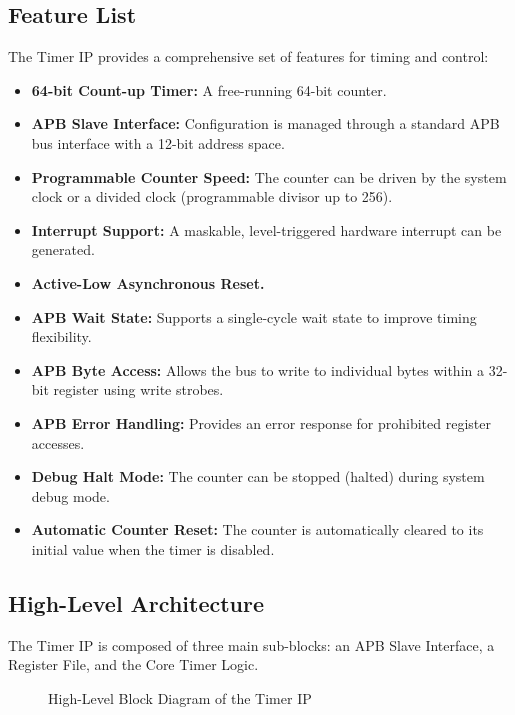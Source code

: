 \documentclass[11pt, a4paper]{article}
\begin{document}
\subsection{Feature List}
The Timer IP provides a comprehensive set of features for timing and control:
\begin{itemize}
    \item \textbf{64-bit Count-up Timer:} A free-running 64-bit counter.
    \item \textbf{APB Slave Interface:} Configuration is managed through a standard APB bus interface with a 12-bit address space.
    \item \textbf{Programmable Counter Speed:} The counter can be driven by the system clock or a divided clock (programmable divisor up to 256).
    \item \textbf{Interrupt Support:} A maskable, level-triggered hardware interrupt can be generated.
    \item \textbf{Active-Low Asynchronous Reset.}
    \item \textbf{APB Wait State:} Supports a single-cycle wait state to improve timing flexibility.
    \item \textbf{APB Byte Access:} Allows the bus to write to individual bytes within a 32-bit register using write strobes.
    \item \textbf{APB Error Handling:} Provides an error response for prohibited register accesses.
    \item \textbf{Debug Halt Mode:} The counter can be stopped (halted) during system debug mode.
    \item \textbf{Automatic Counter Reset:} The counter is automatically cleared to its initial value when the timer is disabled.
\end{itemize}

\subsection{High-Level Architecture}
The Timer IP is composed of three main sub-blocks: an APB Slave Interface, a Register File, and the Core Timer Logic.

\begin{figure}[H]
    \centering
    \caption{High-Level Block Diagram of the Timer IP}
    \label{fig:block_diagram}
\end{figure}
\end{document}
